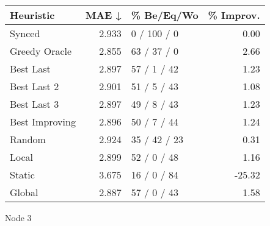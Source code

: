 \begin{tabular}{lrlr}
\toprule
\textbf{Heuristic} & \textbf{MAE ↓} & \textbf{\% Be/Eq/Wo} & \textbf{\% Improv.} \\
\midrule
            Synced &          2.933 &          0 / 100 / 0 &                0.00 \\
     Greedy Oracle &          2.855 &          63 / 37 / 0 &                2.66 \\
         Best Last &          2.897 &          57 / 1 / 42 &                1.23 \\
       Best Last 2 &          2.901 &          51 / 5 / 43 &                1.08 \\
       Best Last 3 &          2.897 &          49 / 8 / 43 &                1.23 \\
    Best Improving &          2.896 &          50 / 7 / 44 &                1.24 \\
            Random &          2.924 &         35 / 42 / 23 &                0.31 \\
             Local &          2.899 &          52 / 0 / 48 &                1.16 \\
            Static &          3.675 &          16 / 0 / 84 &              -25.32 \\
            Global &          2.887 &          57 / 0 / 43 &                1.58 \\
\bottomrule
\end{tabular}
\caption{Node 3}
\label{tab:hr_non_lr01_le1_bs2_3}
